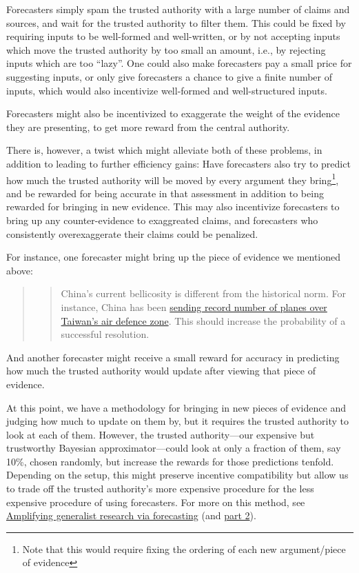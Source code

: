 \documentclass[]{article}
\begin{document}
Forecasters simply spam the trusted authority with a large number of
claims and sources, and wait for the trusted authority to filter them.
This could be fixed by requiring inputs to be well-formed and
well-written, or by not accepting inputs which move the trusted
authority by too small an amount, i.e., by rejecting inputs which are
too ``lazy''. One could also make forecasters pay a small price for
suggesting inputs, or only give forecasters a chance to give a finite
number of inputs, which would also incentivize well-formed and
well-structured inputs.

Forecasters might also be incentivized to exaggerate the weight of the
evidence they are presenting, to get more reward from the central
authority.

There is, however, a twist which might alleviate both of these problems,
in addition to leading to further efficiency gains: Have forecasters
also try to predict how much the trusted authority will be moved by
every argument they
bring\footnote{Note that this would require fixing the ordering of each new argument/piece of evidence},
and be rewarded for being accurate in that assessment in addition to
being rewarded for bringing in new evidence. This may also incentivize
forecasters to bring up any counter-evidence to exaggreated claims, and
forecasters who consistently overexaggerate their claims could be
penalized.

For instance, one forecaster might bring up the piece of evidence we
mentioned above:

\begin{quote}
\begin{quote}
China's current bellicosity is different from the historical norm. For
instance, China has been
\href{https://www.bbc.co.uk/news/world-asia-58794094}{sending record
number of planes over Taiwan's air defence zone}. This should increase
the probability of a successful resolution.
\end{quote}
\end{quote}

And another forecaster might receive a small reward for accuracy in
predicting how much the trusted authority would update after viewing
that piece of evidence.

At this point, we have a methodology for bringing in new pieces of
evidence and judging how much to update on them by, but it requires the
trusted authority to look at each of them. However, the trusted
authority---our expensive but trustworthy Bayesian approximator---could
look at only a fraction of them, say 10\%, chosen randomly, but increase
the rewards for those predictions tenfold. Depending on the setup, this
might preserve incentive compatibility but allow us to trade off the
trusted authority's more expensive procedure for the less expensive
procedure of using forecasters. For more on this method, see
\href{https://www.lesswrong.com/posts/cLtdcxu9E4noRSons/part-1-amplifying-generalist-research-via-forecasting}{Amplifying
generalist research via forecasting} (and
\href{https://www.lesswrong.com/posts/FeE9nR7RPZrLtsYzD/part-2-amplifying-generalist-research-via-forecasting}{part
2}).
\end{document}
